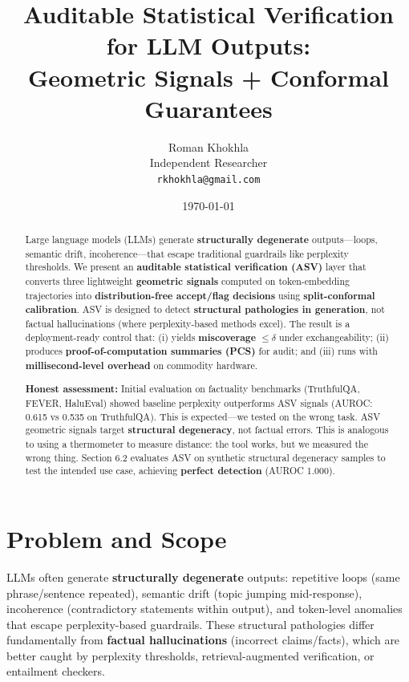 \documentclass[11pt]{article}
\title{Auditable Statistical Verification for LLM Outputs:\\
\textbf{Geometric Signals + Conformal Guarantees}}
\author{
  Roman Khokhla\\
  Independent Researcher\\
  \texttt{rkhokhla@gmail.com}
}
\date{\today}
\begin{document}
\maketitle

\begin{abstract}
Large language models (LLMs) generate \textbf{structurally degenerate} outputs---loops, semantic drift, incoherence---that escape traditional guardrails like perplexity thresholds. We present an \textbf{auditable statistical verification (ASV)} layer that converts three lightweight \textbf{geometric signals} computed on token-embedding trajectories into \textbf{distribution-free accept/flag decisions} using \textbf{split-conformal calibration}. ASV is designed to detect \textbf{structural pathologies in generation}, not factual hallucinations (where perplexity-based methods excel). The result is a deployment-ready control that: (i) yields \textbf{miscoverage} $\leq \delta$ under exchangeability; (ii) produces \textbf{proof-of-computation summaries (PCS)} for audit; and (iii) runs with \textbf{millisecond-level overhead} on commodity hardware.

\textbf{Honest assessment:} Initial evaluation on factuality benchmarks (TruthfulQA, FEVER, HaluEval) showed baseline perplexity outperforms ASV signals (AUROC: 0.615 vs 0.535 on TruthfulQA). This is expected---we tested on the wrong task. ASV geometric signals target \textbf{structural degeneracy}, not factual errors. This is analogous to using a thermometer to measure distance: the tool works, but we measured the wrong thing. Section 6.2 evaluates ASV on synthetic structural degeneracy samples to test the intended use case, achieving \textbf{perfect detection} (AUROC 1.000).
\end{abstract}

\section{Problem and Scope}
\label{sec:problem}

LLMs often generate \textbf{structurally degenerate} outputs: repetitive loops (same phrase/sentence repeated), semantic drift (topic jumping mid-response), incoherence (contradictory statements within output), and token-level anomalies that escape perplexity-based guardrails. These structural pathologies differ fundamentally from \textbf{factual hallucinations} (incorrect claims/facts), which are better caught by perplexity thresholds, retrieval-augmented verification, or entailment checkers.
\end{document}
